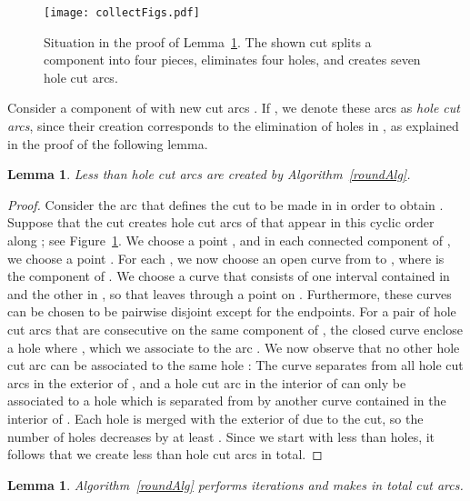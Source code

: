 \documentclass{article}
\newtheorem{lemma}[theorem]{Lemma}
\begin{document}
\begin{figure}
\centering
\texttt{[image: collectFigs.pdf]}
\caption{Situation in the proof of Lemma~\ref{lemma:holearcs}.
The shown cut splits a component into four pieces, eliminates four holes, and creates seven hole cut arcs.}
\label{fig:lemma:holearcs}
\end{figure}

Consider a component  of  with new cut arcs .
If , we denote these arcs as \emph{hole cut arcs}, since their creation corresponds to the elimination of  holes in , as explained in the proof of the following lemma.

\begin{lemma}\label{lemma:holearcs}
Less than  hole cut arcs are created by Algorithm~\ref{roundAlg}.
\end{lemma}

\begin{proof}
Consider the arc  that defines the cut to be made in  in order to obtain .
Suppose that the cut creates hole cut arcs  of  that appear in this cyclic order along ; see Figure~\ref{fig:lemma:holearcs}.
We choose a point , and in each connected component  of , we choose a point .
For each , we now choose an open curve  from  to , where  is the component of .
We choose a curve  that consists of one interval contained in  and the other in , so that  leaves  through a point on .
Furthermore, these curves  can be chosen to be pairwise disjoint except for the endpoints.
For a pair  of hole cut arcs that are consecutive on the same component of , the closed curve  enclose a hole  where , which we associate to the arc .
We now observe that no other hole cut arc can be associated to the same hole :
The curve  separates  from all hole cut arcs in the exterior of , and a hole cut arc  in the interior of  can only be associated to a hole  which is separated from  by another curve  contained in the interior of .
Each hole  is merged with the exterior of  due to the cut, so the number of holes decreases by at least .
Since we start with less than  holes, it follows that we create less than  hole cut arcs in total.
\end{proof}


\begin{lemma}\label{linearIts}
Algorithm~\ref{roundAlg} performs  iterations and makes in total  cut arcs.
\end{lemma}
\end{document}
